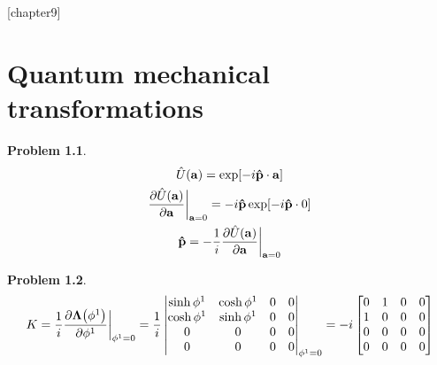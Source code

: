 \documentclass{report}
\theoremstyle{definition}
\begin{document}
\newtheorem{chapter9}{Problem}
[chapter9]
\chapter{Quantum mechanical transformations}

\begin{chapter9}
	\begin{gather*}
		\hat{U}\pqty{\bf a} = \exp[-i\bf{\hat p\cdot a}] \\
		\pdv{\hat{U}\pqty{\bf a}}{\bf a}\bigg|_{{\bf a} = 0} = -i{\bf \hat p}\exp[-i{\bf\hat{p}}\cdot 0]\\
		{\bf \hat{p}} = -\frac{1}{i}\pdv{\hat{U}\pqty{\bf a}}{\bf a}\bigg|_{{\bf a} = 0}
	\end{gather*}
\end{chapter9}

\begin{chapter9}
	\begin{gather*}
		K = \frac{1}{i}\pdv{{\bf \Lambda}\pqty{\phi^1}}{\phi^1}\bigg|_{{\phi^1} = 0} = \frac{1}{i}\begin{vmatrix}
			\sinh \phi^1 & \cosh \phi^1 & 0 & 0 \\
			\cosh \phi^1 & \sinh \phi^1 & 0 & 0 \\
			0 & 0 & 0 & 0 \\
			0 & 0 & 0 & 0
		\end{vmatrix}_{\phi^1 = 0}
		= -i\begin{bmatrix}
			0 & 1 & 0 & 0 \\
			1 & 0 & 0 & 0 \\
			0 & 0 & 0 & 0 \\
			0 & 0 & 0 & 0
		\end{bmatrix}
	\end{gather*}
\end{chapter9}
\end{document}
